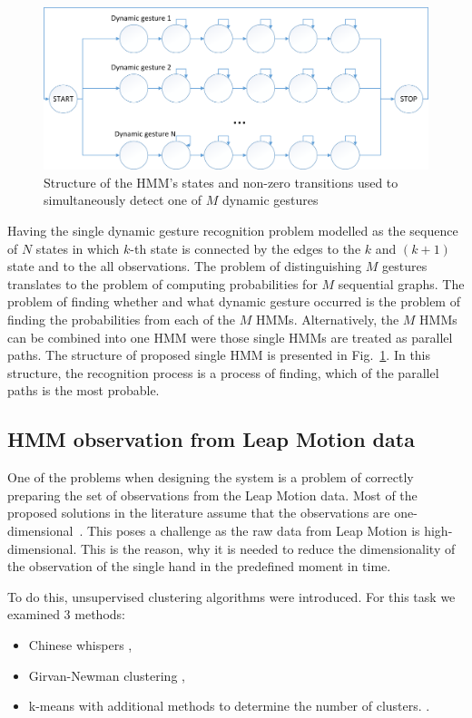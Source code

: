 \begin{figure}[htb]
\centering
 \includegraphics[width=1\columnwidth]{figures/HMM_eng.png}
 \caption{Structure of the HMM's states and non-zero transitions used to simultaneously detect one of $M$ dynamic gestures}
 \label{HMMstructure}
\end{figure}

Having the single dynamic gesture recognition problem modelled as the sequence of $N$ states in which $k$-th state is connected by the edges to the $k$ and $(k+1)$ state and to the all observations.
The problem of distinguishing $M$ gestures translates to the problem of computing probabilities for $M$ sequential graphs.
The problem of finding whether and what dynamic gesture occurred is the problem of finding the probabilities from each of the $M$ HMMs.
Alternatively, the $M$ HMMs can be combined into one HMM were those single HMMs are treated as parallel paths.
The structure of proposed single HMM is presented in Fig.~\ref{HMMstructure}.
In this structure, the recognition process is a process of finding, which of the parallel paths is the most probable.

\subsection{HMM observation from Leap Motion data}

One of the problems when designing the system is a problem of correctly preparing the set of observations from the Leap Motion data.
Most of the proposed solutions in the literature assume that the observations are one-dimensional~\cite{hmmtutorial, hmm}.
This poses a challenge as the raw data from Leap Motion is high-dimensional.
This is the reason, why it is needed to reduce the dimensionality of the observation of the single hand in the predefined moment in time.

To do this, unsupervised clustering algorithms were introduced. 
For this task we examined 3 methods:
\begin{itemize}
\item Chinese whispers \cite{CW1, CW2},
\item Girvan-Newman clustering \cite{Newman},
\item k-means with additional methods to determine the number of clusters. \cite{kmeans1, kmeans2}.
\end{itemize}

